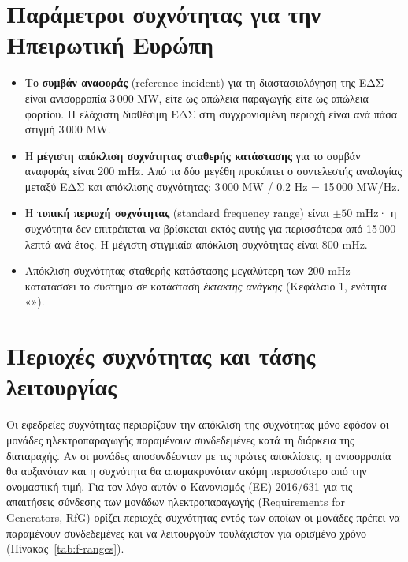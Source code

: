 \section{Παράμετροι συχνότητας για την Ηπειρωτική Ευρώπη}
\label{sec:ce-params}

\begin{itemize}
\item Το \textbf{συμβάν αναφοράς} (reference incident) για τη διαστασιολόγηση της ΕΔΣ είναι
      ανισορροπία 3\,000 MW, είτε ως απώλεια παραγωγής είτε ως απώλεια φορτίου. Η ελάχιστη
      διαθέσιμη ΕΔΣ στη συγχρονισμένη περιοχή είναι ανά πάσα στιγμή 3\,000 MW.
\item Η \textbf{μέγιστη απόκλιση συχνότητας σταθερής κατάστασης} για το συμβάν αναφοράς
      είναι 200 mHz. Από τα δύο μεγέθη προκύπτει ο συντελεστής αναλογίας μεταξύ ΕΔΣ και
      απόκλισης συχνότητας: 3\,000 MW / 0,2 Hz = 15\,000 MW/Hz.
\item Η \textbf{τυπική περιοχή συχνότητας} (standard frequency range) είναι $\pm 50$ mHz· η
      συχνότητα δεν επιτρέπεται να βρίσκεται εκτός αυτής για περισσότερα από
      15\,000 λεπτά ανά έτος. Η μέγιστη στιγμιαία απόκλιση συχνότητας είναι 800 mHz.
\item Απόκλιση συχνότητας σταθερής κατάστασης μεγαλύτερη των 200 mHz κατατάσσει το σύστημα
      σε κατάσταση \emph{έκτακτης ανάγκης} (Κεφάλαιο 1, ενότητα
      «»).
\end{itemize}

\section{Περιοχές συχνότητας και τάσης λειτουργίας}
\label{sec:f-ranges}

Οι εφεδρείες συχνότητας περιορίζουν την απόκλιση της συχνότητας μόνο εφόσον οι μονάδες
ηλεκτροπαραγωγής παραμένουν συνδεδεμένες κατά τη διάρκεια της διαταραχής. Αν οι μονάδες
αποσυνδέονταν με τις πρώτες αποκλίσεις, η ανισορροπία θα αυξανόταν και η συχνότητα θα
απομακρυνόταν ακόμη περισσότερο από την ονομαστική τιμή. Για τον λόγο αυτόν ο Κανονισμός (ΕΕ)
2016/631 για τις απαιτήσεις σύνδεσης των μονάδων ηλεκτροπαραγωγής (Requirements for
Generators, RfG) ορίζει περιοχές συχνότητας εντός των οποίων οι μονάδες πρέπει να παραμένουν
συνδεδεμένες και να λειτουργούν τουλάχιστον για ορισμένο χρόνο (Πίνακας~\ref{tab:f-ranges}).

